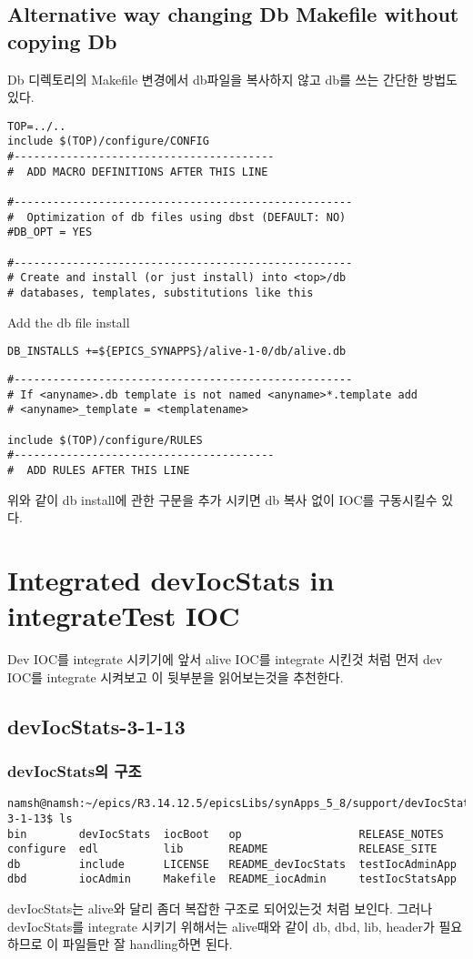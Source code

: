 \documentclass[11pt
  , a4paper
  , article
  , oneside
]{memoir}
\begin{document}
\section{Alternative way changing Db Makefile without copying Db}
Db 디렉토리의 Makefile 변경에서 db파일을 복사하지 않고 db를 쓰는 간단한 방법도 있다.
\begin{lstlisting}[style=termstyle]
TOP=../..
include $(TOP)/configure/CONFIG
#----------------------------------------
#  ADD MACRO DEFINITIONS AFTER THIS LINE

#----------------------------------------------------
#  Optimization of db files using dbst (DEFAULT: NO)
#DB_OPT = YES

#----------------------------------------------------
# Create and install (or just install) into <top>/db
# databases, templates, substitutions like this
\end{lstlisting}
Add the db file install
\begin{lstlisting}[style=termstyle]
DB_INSTALLS +=${EPICS_SYNAPPS}/alive-1-0/db/alive.db
\end{lstlisting}
\begin{lstlisting}[style=termstyle]
#----------------------------------------------------
# If <anyname>.db template is not named <anyname>*.template add
# <anyname>_template = <templatename>

include $(TOP)/configure/RULES
#----------------------------------------
#  ADD RULES AFTER THIS LINE

\end{lstlisting}
위와 같이 db install에 관한 구문을 추가 시키면 db 복사 없이 IOC를 구동시킬수 있다.
\clearpage
\chapter{Integrated devIocStats in integrateTest IOC}
Dev IOC를 integrate 시키기에 앞서 alive IOC를 integrate 시킨것 처럼 먼저 dev IOC를 integrate 시켜보고 이 뒷부분을 읽어보는것을 추천한다.
\section{devIocStats-3-1-13}
\subsection{devIocStats의 구조}
\begin{lstlisting}[style=termstyle]
namsh@namsh:~/epics/R3.14.12.5/epicsLibs/synApps_5_8/support/devIocStats-3-1-13$ ls
bin        devIocStats  iocBoot   op                  RELEASE_NOTES
configure  edl          lib       README              RELEASE_SITE
db         include      LICENSE   README_devIocStats  testIocAdminApp
dbd        iocAdmin     Makefile  README_iocAdmin     testIocStatsApp
\end{lstlisting}
devIocStats는 alive와 달리 좀더 복잡한 구조로 되어있는것 처럼 보인다. 그러나 devIocStats를 integrate 시키기 위해서는 alive때와 같이 db, dbd, lib, header가 필요하므로 이 파일들만 잘 handling하면 된다.
\end{document}

